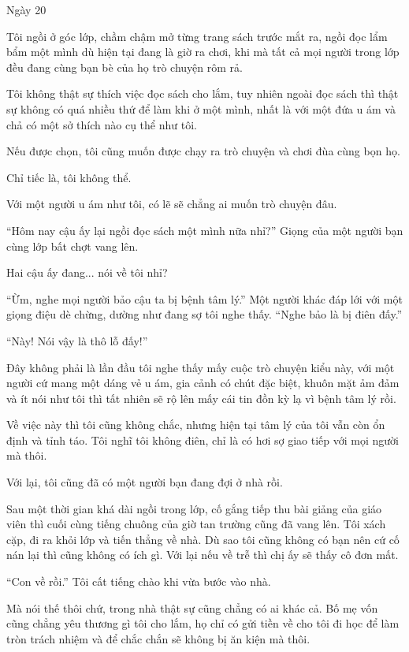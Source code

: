 {Ngày 20}
{
Tôi ngồi ở góc lớp, chầm chậm mở từng trang sách trước mắt ra, ngồi đọc
lẩm bẩm một mình dù hiện tại đang là giờ ra chơi, khi mà tất cả mọi
người trong lớp đều đang cùng bạn bè của họ trò chuyện rôm rả.

Tôi không thật sự thích việc đọc sách cho lắm, tuy nhiên ngoài đọc sách
thì thật sự không có quá nhiều thứ để làm khi ở một mình, nhất là với
một đứa u ám và chả có một sở thích nào cụ thể như tôi.

Nếu được chọn, tôi cũng muốn được chạy ra trò chuyện và chơi đùa cùng
bọn họ.

Chỉ tiếc là, tôi không thể.

Với một người u ám như tôi, có lẽ sẽ chẳng ai muốn trò chuyện đâu.

``Hôm nay cậu ấy lại ngồi đọc sách một mình nữa nhỉ?'' Giọng của một
người bạn cùng lớp bất chợt vang lên.

Hai cậu ấy đang... nói về tôi nhỉ?

``Ừm, nghe mọi người bảo cậu ta bị bệnh tâm lý.'' Một người khác đáp lới
với một giọng điệu dè chừng, dường như đang sợ tôi nghe thấy. ``Nghe bảo
là bị điên đấy.''

``Này! Nói vậy là thô lỗ đấy!''

Đây không phải là lần đầu tôi nghe thấy mấy cuộc trò chuyện kiểu này,
với một người cứ mang một dáng vẻ u ám, gia cảnh có chút đặc biệt, khuôn
mặt ảm đảm và ít nói như tôi thì tất nhiên sẽ rộ lên mấy cái tin đồn kỳ
lạ vì bệnh tâm lý rồi.

Về việc này thì tôi cũng không chắc, nhưng hiện tại tâm lý của tôi vẫn
còn ổn định và tỉnh táo. Tôi nghĩ tôi không điên, chỉ là có hơi sợ giao
tiếp với mọi người mà thôi.

Với lại, tôi cũng đã có một người bạn đang đợi ở nhà rồi.

Sau một thời gian khá dài ngồi trong lớp, cố gắng tiếp thu bài giảng của
giáo viên thì cuối cùng tiếng chuông của giờ tan trường cũng đã vang
lên. Tôi xách cặp, đi ra khỏi lớp và tiến thẳng về nhà. Dù sao tôi cũng
không có bạn nên cứ cố nán lại thì cũng không có ích gì. Với lại nếu về
trễ thì chị ấy sẽ thấy cô đơn mất.

``Con về rồi.'' Tôi cất tiếng chào khi vừa bước vào nhà.

Mà nói thế thôi chứ, trong nhà thật sự cũng chẳng có ai khác cả. Bố mẹ
vốn cũng chẳng yêu thương gì tôi cho lắm, họ chỉ có gửi tiền về cho tôi
đi học để làm tròn trách nhiệm và để chắc chắn sẽ không bị ăn kiện mà
thôi.

}

